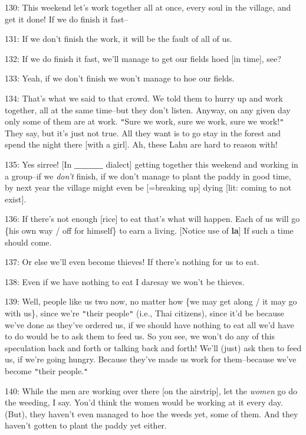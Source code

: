 130: This weekend let's work together all at once, every soul in the village, and
get it done! If we do finish it fast--

131: If we don't finish the work, it will be the fault of all of us.

132: If we do finish it fast, we'll manage to get our fields hoed [in time], see?

133: Yeah, if we don't finish we won't manage to hoe our fields.

134: That's what we said to that crowd. We told them to hurry up and work together,
all at the same time--but they don't listen. Anyway, on any given day only some
of them are at work. \texttt{"}Sure we work, sure we work, sure we work!\texttt{"}
They say, but it's just not true. All they want is to go stay in the forest and
spend the night there [with a girl]. Ah, these Lahu are hard to reason with!

135: Yes sirree!  [In \textbf{\_\_\_\_} dialect] getting together this weekend
and working in a group--if we\textit{ don't} finish, if we don't manage to plant
the paddy in good time, by next year the village might even be [=breaking up] dying
[lit: coming to not exist].

136: If there's not enough [rice] to eat that's what will happen. Each of us will
go \{his own way / off for himself\} to earn a living. [Notice use of \textbf{la}]
If such a time should come.

137: Or else we'll even become thieves! If there's nothing for us to eat.

138: Even if we have nothing to eat I daresay we won't be thieves.

139: Well, people like us two now, no matter how \{we may get along / it may go
with us\}, since we're \texttt{"}their people\texttt{"} (i.e., Thai citizens),
since it'd be because we've done as they've ordered us, if we should have nothing
to eat all we'd have to do would be to ask them to feed us. So you see, we won't
do any of this speculation back and forth or talking back and forth! We'll (just)
ask then to feed us, if we're going hungry. Because they've made us work for them--because
we've become \texttt{"}their people.\texttt{"}

140: While the men are working over there [on the airstrip], let the \textit{women
}go do the weeding, I say. You'd think the women would be working at it every day.
(But), they haven't even managed to hoe the weeds yet, some of them. And they haven't
gotten to plant the paddy yet either.

